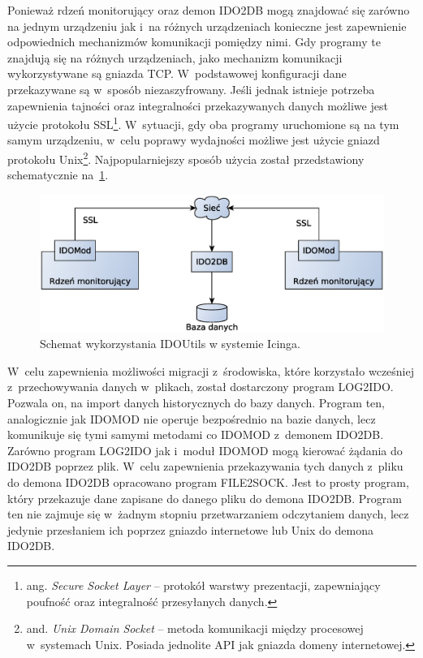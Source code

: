 Ponieważ rdzeń monitorujący oraz demon IDO2DB mogą znajdować się
zarówno na jednym urządzeniu jak i~na różnych urządzeniach konieczne
jest zapewnienie odpowiednich mechanizmów komunikacji pomiędzy nimi.
Gdy programy te znajdują się na różnych urządzeniach, jako mechanizm
komunikacji wykorzystywane są gniazda TCP. W~podstawowej konfiguracji
dane przekazywane są w~sposób niezaszyfrowany. Jeśli jednak istnieje
potrzeba zapewnienia tajności oraz integralności przekazywanych danych
możliwe jest użycie protokołu SSL\footnote{ ang. {\em Secure Socket
    Layer} -- protokół warstwy prezentacji, zapewniający poufność oraz
  integralność przesyłanych danych.}. W~sytuacji, gdy oba programy
uruchomione są na tym samym urządzeniu, w~celu poprawy wydajności
możliwe jest użycie gniazd protokołu Unix\footnote{ and. {\em Unix
    Domain Socket} -- metoda komunikacji między procesowej w~systemach
  Unix. Posiada jednolite API jak gniazda domeny
  internetowej.}. Najpopularniejszy sposób użycia został przedstawiony
schematycznie na~\ref{fig:IDOUtils}.

\begin{figure}[ht]
  \caption{Schemat wykorzystania IDOUtils w systemie Icinga.}
  \label{fig:IDOUtils}
\includegraphics[width=1\textwidth]{img/idoutils}
\end{figure}

W~celu zapewnienia możliwości migracji z~środowiska, które korzystało
wcześniej z~przechowywania danych w~plikach, został dostarczony
program LOG2IDO. Pozwala on, na import danych historycznych do bazy
danych. Program ten, analogicznie jak IDOMOD nie operuje bezpośrednio
na bazie danych, lecz komunikuje się tymi samymi metodami co IDOMOD
z~demonem IDO2DB. Zarówno program LOG2IDO jak i~moduł IDOMOD mogą
kierować żądania do IDO2DB poprzez plik. W~celu zapewnienia
przekazywania tych danych z~pliku do demona IDO2DB opracowano program
FILE2SOCK. Jest to prosty program, który przekazuje dane zapisane do
danego pliku do demona IDO2DB. Program ten nie zajmuje się w~żadnym
stopniu przetwarzaniem odczytaniem danych, lecz jedynie przesłaniem ich
poprzez gniazdo internetowe lub Unix do demona IDO2DB.

